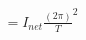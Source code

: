 \documentclass[preview]{standalone}
\begin{document}
\begin{align*}
= I_{net} \frac{(2\pi)}{T}^2
\end{align*}
\end{document}
